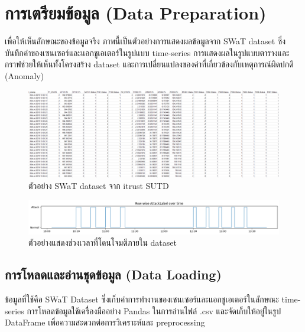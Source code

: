 \section{การเตรียมข้อมูล (Data Preparation)}
\hspace{2em} เพื่อให้เห็นลักษณะของข้อมูลจริง ภาพนี้เป็นตัวอย่างการแสดงผลข้อมูลจาก SWaT dataset ซึ่งบันทึกค่าของเซนเซอร์และแอกชูเอเตอร์ในรูปแบบ time-series การแสดงผลในรูปแบบตารางและกราฟช่วยให้เห็นทั้งโครงสร้าง dataset และการเปลี่ยนแปลงของค่าที่เกี่ยวข้องกับเหตุการณ์ผิดปกติ (Anomaly)

\begin{figure}[h]
\begin{center}
\includegraphics[width=\textwidth]{Image/dataset1.png}
\end{center}
\caption[ตัวอย่าง SWaT dataset]{ตัวอย่าง SWaT dataset จาก itrust SUTD}
\end{figure}

\begin{figure}
\begin{center}
\includegraphics[width=\textwidth]{Image/dataset2.png}
\end{center}
\caption[ตัวอย่างแสดงช่วงเวลาที่โดนโจมตีภายใน dataset]{ตัวอย่างแสดงช่วงเวลาที่โดนโจมตีภายใน dataset}
\end{figure}

\subsection{การโหลดและอ่านชุดข้อมูล (Data Loading)}
\hspace{2em} ข้อมูลที่ใช้คือ SWaT Dataset ซึ่งเก็บค่าการทำงานของเซนเซอร์และแอกชูเอเตอร์ในลักษณะ time-series การโหลดข้อมูลใช้เครื่องมืออย่าง Pandas ในการอ่านไฟล์ .csv และจัดเก็บให้อยู่ในรูป DataFrame เพื่อความสะดวกต่อการวิเคราะห์และ preprocessing

